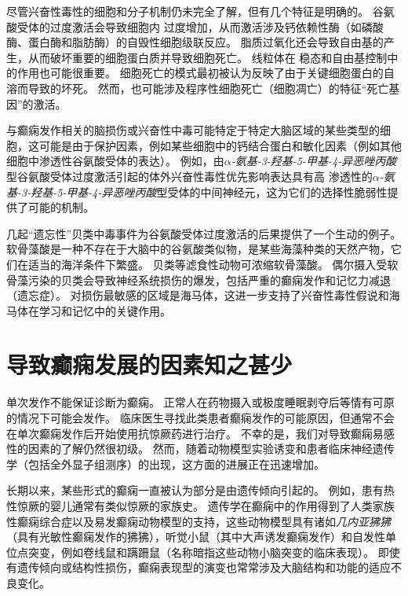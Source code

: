 尽管兴奋性毒性的细胞和分子机制仍未完全了解，但有几个特征是明确的。
谷氨酸受体的过度激活会导致细胞内  过度增加，从而激活涉及钙依赖性酶（如磷酸酶、蛋白酶和脂肪酶）的自毁性细胞级联反应。
脂质过氧化还会导致自由基的产生，从而破坏重要的细胞蛋白质并导致细胞死亡。
线粒体在  稳态和自由基控制中的作用也可能很重要。
细胞死亡的模式最初被认为反映了由于关键细胞蛋白的自溶而导致的坏死。
然而，也可能涉及程序性细胞死亡（细胞凋亡）的特征“死亡基因”的激活。


与癫痫发作相关的脑损伤或兴奋性中毒可能特定于特定大脑区域的某些类型的细胞，这可能是由于保护因素，例如某些细胞中的钙结合蛋白和敏化因素（例如其他细胞中渗透性谷氨酸受体的表达）。
例如，由\textit{$\alpha$-氨基-3-羟基-5-甲基-4-异恶唑丙酸}型谷氨酸受体过度激活引起的体外兴奋性毒性优先影响表达具有高  渗透性的\textit{$\alpha$-氨基-3-羟基-5-甲基-4-异恶唑丙酸}型受体的中间神经元，这为它们的选择性脆弱性提供了可能的机制。


几起“遗忘性”贝类中毒事件为谷氨酸受体过度激活的后果提供了一个生动的例子。
软骨藻酸是一种不存在于大脑中的谷氨酸类似物，是某些海藻种类的天然产物，它们在适当的海洋条件下繁盛。
贝类等滤食性动物可浓缩软骨藻酸。
偶尔摄入受软骨藻污染的贝类会导致神经系统损伤的爆发，包括严重的癫痫发作和记忆力减退（遗忘症）。
对损伤最敏感的区域是海马体，这进一步支持了兴奋性毒性假说和海马体在学习和记忆中的关键作用。



\section{导致癫痫发展的因素知之甚少}

单次发作不能保证诊断为癫痫。
正常人在药物摄入或极度睡眠剥夺后等情有可原的情况下可能会发作。
临床医生寻找此类患者癫痫发作的可能原因，但通常不会在单次癫痫发作后开始使用抗惊厥药进行治疗。
不幸的是，我们对导致癫痫易感性的因素的了解仍然很初级。
然而，随着动物模型实验诱变和患者临床神经遗传学（包括全外显子组测序）的出现，这方面的进展正在迅速增加。


长期以来，某些形式的癫痫一直被认为部分是由遗传倾向引起的。
例如，患有热性惊厥的婴儿通常有类似惊厥的家族史。
遗传学在癫痫中的作用得到了人类家族性癫痫综合症以及易发癫痫动物模型的支持，这些动物模型具有诸如\textit{几内亚狒狒}（具有光敏性癫痫发作的狒狒），听觉小鼠（其中大声诱发癫痫发作）和自发性单位点突变，例如卷线鼠和蹒跚鼠（名称暗指这些动物小脑突变的临床表现）。
即使有遗传倾向或结构性损伤，癫痫表现型的演变也常常涉及大脑结构和功能的适应不良变化。



